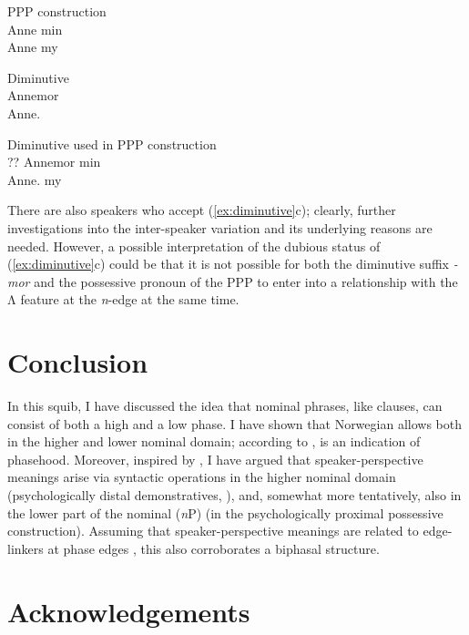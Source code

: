 \documentclass[output=paper]{langsci/langscibook}
\begin{document}
\ea\label{ex:diminutive}
\ea \hphantom{??} \gls{PPP} construction\\
    \hphantom{??} \gll  Anne min\\
	                     Anne my {}\\
\glt

\ex \hphantom{??} Diminutive\\
	\hphantom{??} \gll Annemor \\
	Anne.\Dim{}\\
\glt

\ex \hphantom{??} Diminutive used in \gls{PPP} construction\\
    ?? \gll  Annemor min\\
	        Anne.\Dim{} my\\
    \glt
	\z
\z

\noindent There are also  speakers who accept (\ref{ex:diminutive}c); clearly,
further investigations into the inter-speaker variation and its underlying
reasons are needed. However, a possible interpretation of the dubious status of
(\ref{ex:diminutive}c) could be that it is not possible for both the diminutive
suffix \emph{-mor} and the possessive pronoun of the  PPP to enter into a
relationship with the Λ feature at the \emph{n}-edge
at the same time.

\section{Conclusion}

In this squib, I have discussed the idea that  nominal phrases, like
clauses,  can consist of both a high and a low phase. I have shown that
Norwegian allows  both in the higher and lower nominal domain;
according to \citet{Boskovic2014},  is an indication of phasehood.
Moreover, inspired by \textcite{sigurdsson2014context}, I have argued that
speaker-perspective meanings arise via syntactic operations in the higher
nominal domain (psychologically distal
demonstratives,
\citealt{johannessen2008psycological}), and, somewhat more tentatively, also in the lower part of the nominal
(\emph{n}P)  (in the psychologically proximal possessive construction).
Assuming that speaker-perspective meanings are related
to edge-linkers at phase edges \citep{sigurdsson2014context}, this
also corroborates a biphasal structure.

\section*{Acknowledgements}
\end{document}
